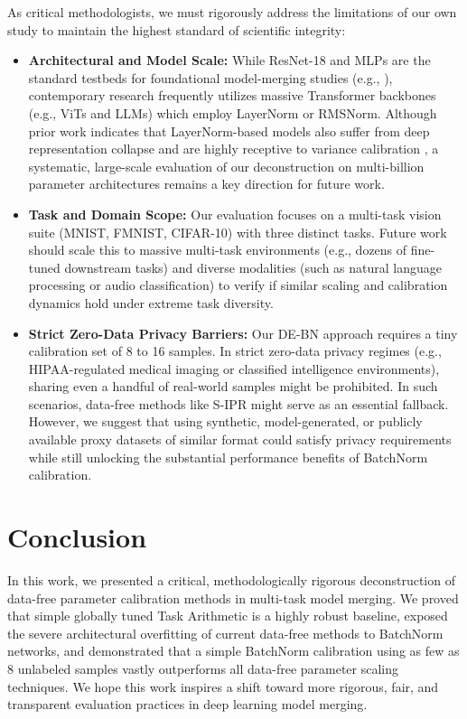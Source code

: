 \documentclass{article}
\begin{document}
As critical methodologists, we must rigorously address the limitations of our own study to maintain the highest standard of scientific integrity:
\begin{itemize}
    \item \textbf{Architectural and Model Scale:} While ResNet-18 and MLPs are the standard testbeds for foundational model-merging studies (e.g., \cite{submission7, submission9}), contemporary research frequently utilizes massive Transformer backbones (e.g., ViTs and LLMs) which employ LayerNorm or RMSNorm. Although prior work indicates that LayerNorm-based models also suffer from deep representation collapse and are highly receptive to variance calibration \cite{jordan2023repair}, a systematic, large-scale evaluation of our deconstruction on multi-billion parameter architectures remains a key direction for future work.
    \item \textbf{Task and Domain Scope:} Our evaluation focuses on a multi-task vision suite (MNIST, FMNIST, CIFAR-10) with three distinct tasks. Future work should scale this to massive multi-task environments (e.g., dozens of fine-tuned downstream tasks) and diverse modalities (such as natural language processing or audio classification) to verify if similar scaling and calibration dynamics hold under extreme task diversity.
    \item \textbf{Strict Zero-Data Privacy Barriers:} Our DE-BN approach requires a tiny calibration set of 8 to 16 samples. In strict zero-data privacy regimes (e.g., HIPAA-regulated medical imaging or classified intelligence environments), sharing even a handful of real-world samples might be prohibited. In such scenarios, data-free methods like S-IPR might serve as an essential fallback. However, we suggest that using synthetic, model-generated, or publicly available proxy datasets of similar format could satisfy privacy requirements while still unlocking the substantial performance benefits of BatchNorm calibration.
\end{itemize}

\section{Conclusion}
\label{sec:conclusion}
In this work, we presented a critical, methodologically rigorous deconstruction of data-free parameter calibration methods in multi-task model merging. We proved that simple globally tuned Task Arithmetic is a highly robust baseline, exposed the severe architectural overfitting of current data-free methods to BatchNorm networks, and demonstrated that a simple BatchNorm calibration using as few as 8 unlabeled samples vastly outperforms all data-free parameter scaling techniques. We hope this work inspires a shift toward more rigorous, fair, and transparent evaluation practices in deep learning model merging.
\end{document}
